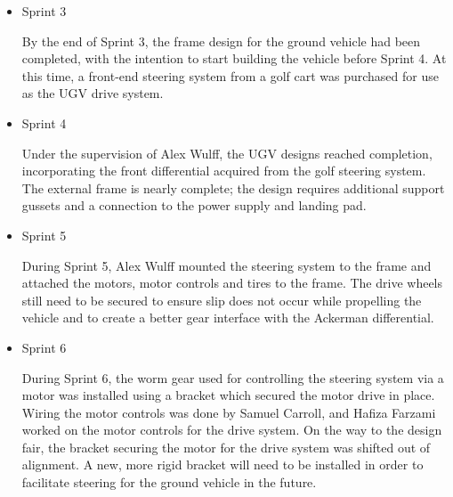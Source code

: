 \begin{itemize}
\item Sprint 3

By the end of Sprint 3, the frame design for the ground vehicle had been completed, with the intention to start building the vehicle before Sprint 4. At this time, a front-end steering system from a golf cart was purchased for use as the UGV drive system.

\item Sprint 4

Under the supervision of Alex Wulff, the UGV designs reached completion, incorporating the front differential acquired from the golf steering system. The external frame is nearly complete; the design requires additional support gussets and a connection to the power supply and landing pad.

\item Sprint 5

During Sprint 5, Alex Wulff mounted the steering system to the frame and attached the motors, motor controls and tires to the frame. The drive wheels still need to be secured to ensure slip does not occur while propelling the vehicle and to create a better gear interface with the Ackerman differential.

\item Sprint 6

During Sprint 6, the worm gear used for controlling the steering system via a motor was installed using a bracket which secured the motor drive in place. Wiring the motor controls was done by Samuel Carroll, and Hafiza Farzami worked on the motor controls for the drive system. On the way to the design fair, the bracket securing the motor for the drive system was shifted out of alignment. A new, more rigid bracket will need to be installed in order to facilitate steering for the ground vehicle in the future.

\end{itemize}

